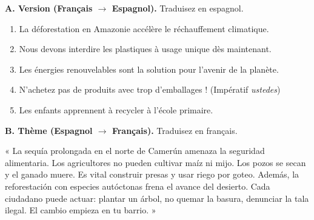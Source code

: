 \documentclass[11pt]{article}
\begin{document}
\begin{exercice}
\textbf{A. Version (Français $\rightarrow$ Espagnol).} Traduisez en espagnol.
\begin{enumerate}
    \item La déforestation en Amazonie accélère le réchauffement climatique.
    \item Nous devons interdire les plastiques à usage unique dès maintenant.
    \item Les énergies renouvelables sont la solution pour l'avenir de la planète.
    \item N'achetez pas de produits avec trop d'emballages ! (Impératif \emph{ustedes})
    \item Les enfants apprennent à recycler à l'école primaire.
\end{enumerate}

\textbf{B. Thème (Espagnol $\rightarrow$ Français).} Traduisez en français.
\begin{textebox}
« La sequía prolongada en el norte de Camerún amenaza la seguridad alimentaria. Los agricultores no pueden cultivar maíz ni mijo. Los pozos se secan y el ganado muere. Es vital construir presas y usar riego por goteo. Además, la reforestación con especies autóctonas frena el avance del desierto. Cada ciudadano puede actuar: plantar un árbol, no quemar la basura, denunciar la tala ilegal. El cambio empieza en tu barrio. »
\end{textebox}
\end{exercice}
\end{document}
